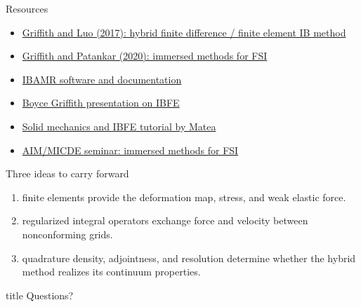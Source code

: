 \documentclass[aspectratio=169,11pt]{beamer}
\begin{document}
\begin{frame}{Resources}
\begin{itemize}\itemsep8pt
  \item \href{https://doi.org/10.1002/cnm.2888}{Griffith and Luo (2017): hybrid finite difference / finite element IB method}
  \item \href{https://doi.org/10.1146/annurev-fluid-010719-060228}{Griffith and Patankar (2020): immersed methods for FSI}
  \item \href{https://ibamr.github.io/}{IBAMR software and documentation}
  \item \href{https://www.youtube.com/watch?v=-1TlNJL93sc}{Boyce Griffith presentation on IBFE}
  \item \href{https://drive.google.com/drive/folders/1vkhrX0YInMm5pfUj3LcRA9TV0DZdFp1a?usp=sharing}{Solid mechanics and IBFE tutorial by Matea}
  \item \href{https://www.classcentral.com/classroom/youtube-aim-micde-seminar-boyce-griffith-immersed-methods-for-fluid-structure-interaction-323154}{AIM/MICDE seminar: immersed methods for FSI}
\end{itemize}
\end{frame}

\begin{frame}{Three ideas to carry forward}
\begin{enumerate}\itemsep11pt
  \item {} finite elements provide the deformation map, stress, and weak elastic force.
  \item {} regularized integral operators exchange force and velocity between nonconforming grids.
  \item {} quadrature density, adjointness, and resolution determine whether the hybrid method realizes its continuum properties.
\end{enumerate}

\vfill
\begin{beamercolorbox}[wd=\textwidth,sep=10pt,center,rounded=true]{title}
{\Large Questions?}
\end{beamercolorbox}
\end{frame}
\end{document}
